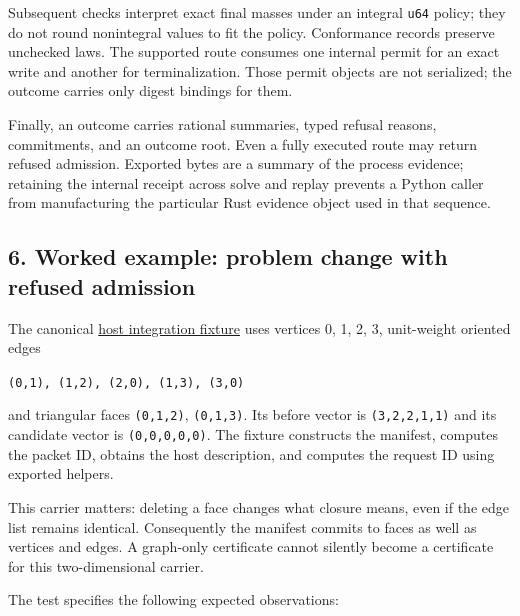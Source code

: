 \documentclass[
  11pt,
]{article}
\newcommand{\passthrough}[1]{#1}
\begin{document}
Subsequent checks interpret exact final masses under an integral
\passthrough{\lstinline!u64!} policy; they do not round nonintegral
values to fit the policy. Conformance records preserve unchecked laws.
The supported route consumes one internal permit for an exact write and
another for terminalization. Those permit objects are not serialized;
the outcome carries only digest bindings for them.

Finally, an outcome carries rational summaries, typed refusal reasons,
commitments, and an outcome root. Even a fully executed route may return
refused admission. Exported bytes are a summary of the process evidence;
retaining the internal receipt across solve and replay prevents a Python
caller from manufacturing the particular Rust evidence object used in
that sequence.

\subsection{6. Worked example: problem change with refused
admission}\label{worked-example-problem-change-with-refused-admission}

The canonical
\href{https://github.com/dbccpage/the_symbol_game/blob/52cb5457f6c485ba548cfd292f6012a941ed22cf/omega_engine/crates_rs/omega_symbol_game/tests/host_contract.rs}{host
integration fixture} uses vertices 0, 1, 2, 3, unit-weight oriented
edges

\passthrough{\lstinline!(0,1), (1,2), (2,0), (1,3), (3,0)!}

and triangular faces \passthrough{\lstinline!(0,1,2)!},
\passthrough{\lstinline!(0,1,3)!}. Its before vector is
\passthrough{\lstinline!(3,2,2,1,1)!} and its candidate vector is
\passthrough{\lstinline!(0,0,0,0,0)!}. The fixture constructs the
manifest, computes the packet ID, obtains the host description, and
computes the request ID using exported helpers.

This carrier matters: deleting a face changes what closure means, even
if the edge list remains identical. Consequently the manifest commits to
faces as well as vertices and edges. A graph-only certificate cannot
silently become a certificate for this two-dimensional carrier.

The test specifies the following expected observations:
\end{document}
